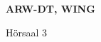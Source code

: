 \documentclass[a4paper]{article}
\begin{document}
\printGenericVSLHeader
\begin{center}
\begin{vsltext}{3cm}{4cm}

   \vspace{0.5cm} 

    \textbf{ARW-DT, WING} 

    \vspace{1.5cm}

    Hörsaal 3

\end{vsltext}

\end{center}
\end{document}
